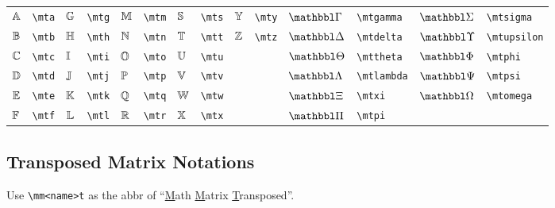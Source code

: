 \documentclass{article}
\begin{document}
\begin{tabular}{*{14}{l}}
    ${\mathbb A}$ & \lstinline`\mta` & ${\mathbb G}$ & \lstinline`\mtg` & ${\mathbb M}$ & \lstinline`\mtm` & ${\mathbb S}$ & \lstinline`\mts` & ${\mathbb Y}$ & \lstinline`\mty` & $\mtgamma$  & \lstinline`\mtgamma` & $\mtsigma$   & \lstinline`\mtsigma` \\
    ${\mathbb B}$ & \lstinline`\mtb` & ${\mathbb H}$ & \lstinline`\mth` & ${\mathbb N}$ & \lstinline`\mtn` & ${\mathbb T}$ & \lstinline`\mtt` & ${\mathbb Z}$ & \lstinline`\mtz` & $\mtdelta$  & \lstinline`\mtdelta` & $\mtupsilon$ & \lstinline`\mtupsilon` \\
    ${\mathbb C}$ & \lstinline`\mtc` & ${\mathbb I}$ & \lstinline`\mti` & ${\mathbb O}$ & \lstinline`\mto` & ${\mathbb U}$ & \lstinline`\mtu` &        &                          & $\mttheta$  & \lstinline`\mttheta` & $\mtphi$     & \lstinline`\mtphi` \\
    ${\mathbb D}$ & \lstinline`\mtd` & ${\mathbb J}$ & \lstinline`\mtj` & ${\mathbb P}$ & \lstinline`\mtp` & ${\mathbb V}$ & \lstinline`\mtv` &        &                          & $\mtlambda$ & \lstinline`\mtlambda` & $\mtpsi$     & \lstinline`\mtpsi` \\
    ${\mathbb E}$ & \lstinline`\mte` & ${\mathbb K}$ & \lstinline`\mtk` & ${\mathbb Q}$ & \lstinline`\mtq` & ${\mathbb W}$ & \lstinline`\mtw` &        &                          & $\mtxi$     & \lstinline`\mtxi` & $\mtomega$   & \lstinline`\mtomega` \\
    ${\mathbb F}$ & \lstinline`\mtf` & ${\mathbb L}$ & \lstinline`\mtl` & ${\mathbb R}$ & \lstinline`\mtr` & ${\mathbb X}$ & \lstinline`\mtx` &        &                          & $\mtpi$     & \lstinline`\mtpi` &                                         \\
\end{tabular}


\subsection{Transposed Matrix Notations}
Use \lstinline`\mm<name>t` as the abbr of ``\underline{M}ath \underline{M}atrix \underline{T}ransposed''.
\end{document}
